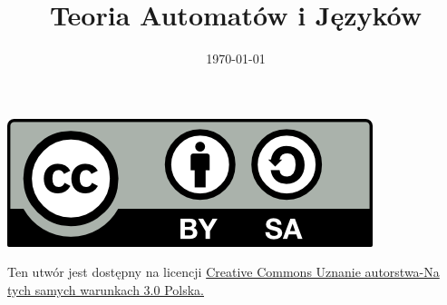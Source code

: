 \documentclass[12pt,a4paper]{article}
\theoremstyle{definition}
\theoremstyle{remark}
\begin{document}
\title{ Teoria Automatów i Języków}
\author{\vspace{-5ex}}
\date{\today}
\maketitle
\tableofcontents

\begin{center}
\leavevmode

\vfill

\includegraphics[width=1 in]{by-sa.png}
\end{center}
\label{fig:cc}
\scriptsize{Ten utwór jest dostępny na licencji  
\href{http://creativecommons.org/licenses/by-sa/3.0/pl/}{Creative Commons Uznanie autorstwa-Na tych samych warunkach 3.0 Polska.}}

\pagebreak






	
\end{document}
